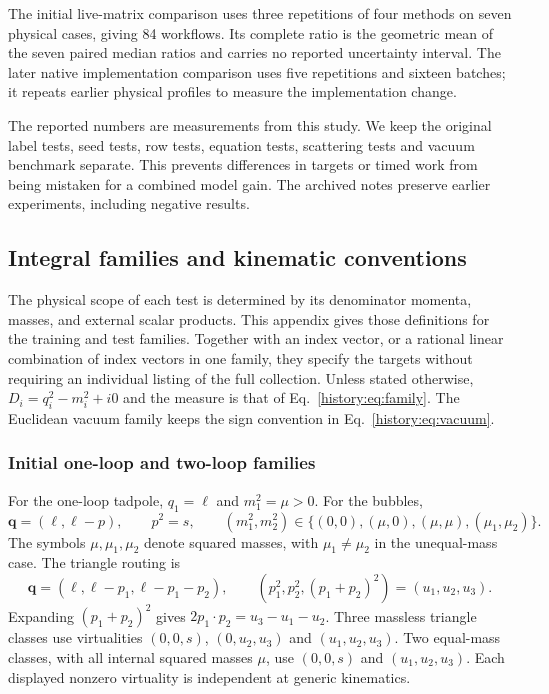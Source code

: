 The initial live-matrix comparison uses three repetitions of four methods on seven physical cases, giving 84 workflows. Its complete ratio is the geometric mean of the seven paired median ratios and carries no reported uncertainty interval. The later native implementation comparison uses five repetitions and sixteen batches; it repeats earlier physical profiles to measure the implementation change.

The reported numbers are measurements from this study. We keep the original label tests, seed tests, row tests, equation tests, scattering tests and vacuum benchmark separate. This prevents differences in targets or timed work from being mistaken for a combined model gain. The archived notes preserve earlier experiments, including negative results.

\subsection{Integral families and kinematic conventions}
\label{history:app:families}
The physical scope of each test is determined by its denominator momenta, masses, and external scalar products. This appendix gives those definitions for the training and test families. Together with an index vector, or a rational linear combination of index vectors in one family, they specify the targets without requiring an individual listing of the full collection. Unless stated otherwise, $D_i=q_i^2-m_i^2+i0$ and the measure is that of Eq.~\eqref{history:eq:family}. The Euclidean vacuum family keeps the sign convention in Eq.~\eqref{history:eq:vacuum}.

\subsubsection{Initial one-loop and two-loop families}
For the one-loop tadpole, $q_1=\ell$ and $m_1^2=\mu>0$. For the bubbles,
\begin{equation}
 \boldsymbol q=(\ell,\ell-p),\qquad p^2=s,
 \qquad (m_1^2,m_2^2)\in\{(0,0),(\mu,0),(\mu,\mu),(\mu_1,\mu_2)\}.
\end{equation}
The symbols $\mu,\mu_1,\mu_2$ denote squared masses, with $\mu_1\ne\mu_2$ in the unequal-mass case. The triangle routing is
\begin{equation}
 \boldsymbol q=(\ell,\ell-p_1,\ell-p_1-p_2),\qquad
 (p_1^2,p_2^2,(p_1+p_2)^2)=(u_1,u_2,u_3).
\end{equation}
Expanding $(p_1+p_2)^2$ gives $2p_1\cdot p_2=u_3-u_1-u_2$. Three massless triangle classes use virtualities $(0,0,s)$, $(0,u_2,u_3)$ and $(u_1,u_2,u_3)$. Two equal-mass classes, with all internal squared masses $\mu$, use $(0,0,s)$ and $(u_1,u_2,u_3)$. Each displayed nonzero virtuality is independent at generic kinematics.

